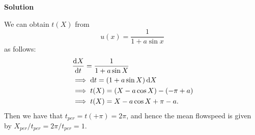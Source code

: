 \documentclass{article}
\begin{document}
\newpage

\textbf{Solution}

We can obtain $t(X)$ from
%
\begin{equation*}
    u(x) = \frac{1}{1 + a \sin x}
\end{equation*}
%
as follows:
%
\begin{align*}
    &\dod{X}{t} = \frac{1}{1 + a \sin X} \\
    &\implies \dif t = \del{1 + a \sin X} \dif X \\
    &\implies t(X) = \del{X - a \cos X} - \del{-\pi + a} \\
    &\implies t(X) = X - a \cos X + \pi - a
    .
\end{align*}
%
Then we have that $t_{per} = t(+\pi) =  2 \pi$, and hence the mean
flowspeed is given by $X_{per}/t_{per} = 2 \pi / t_{per} = 1$.
\end{document}

